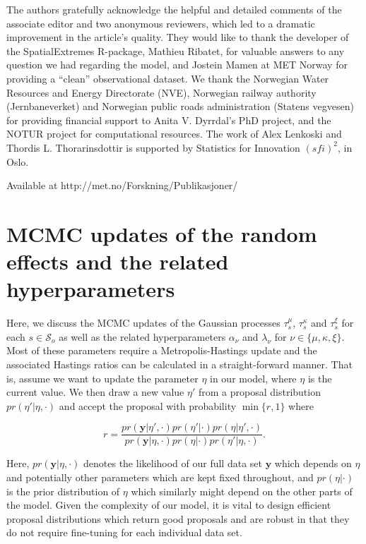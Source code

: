 \documentclass[11pt,english]{article}
\newcommand{\bs}[1]{\boldsymbol{#1}}
\newcommand{\mc}[1]{\mathcal{#1}}
\newcommand{\bl}{\begin{linenomath}}
\newcommand{\el}{\end{linenomath}}
\begin{document}
The authors gratefully acknowledge the helpful and detailed comments of the associate editor and two anonymous reviewers, which led to a dramatic improvement in the article's quality.  They would like to thank the developer of the SpatialExtremes R-package, Mathieu Ribatet, for valuable answers to any question we had regarding the model, and Jostein Mamen at MET Norway for providing a ``clean'' observational dataset. We thank the Norwegian Water Resources and Energy Directorate (NVE), Norwegian railway authority (Jernbaneverket) and Norwegian public roads administration (Statens vegvesen) for providing financial support to Anita V. Dyrrdal's PhD project, and the NOTUR project for computational resources. The work of Alex Lenkoski and Thordis L. Thorarinsdottir is supported by Statistics for Innovation $(sfi)^2$, in Oslo.




\vspace{15mm}
\noindent*Available at http://met.no/Forskning/Publikasjoner/

\appendix

\section{MCMC updates of the random effects and the related hyperparameters}

Here, we discuss the MCMC updates of the Gaussian processes $\tau_s^\mu$, $\tau_s^\kappa$ and $\tau^\xi_s$ for each $s \in \mc{S}_o$ as well as the related hyperparameters $\alpha_\nu$ and $\lambda_\nu$ for $\nu \in \{ \mu, \kappa, \xi \}$. Most of these parameters require a Metropolis-Hastings update and the associated Hastings ratios \citep[e.g.][]{Hoff2009} can be calculated in a straight-forward manner.  That is, assume we want to update the parameter $\eta$ in our model, where $\eta$ is the current value. We then draw a new value $\eta'$ from a proposal distribution $pr(\eta' | \eta, \cdot)$ and accept the proposal with probability $\min \{ r, 1 \}$ where 
\bl\[
r = \frac{pr(\bs{y}| \eta', \cdot) pr(\eta' | \cdot) pr(\eta | \eta', \cdot)}{pr(\bs{y} | \eta, \cdot) pr (\eta| \cdot) pr(\eta' | \eta, \cdot)}.
\]\el
Here, $pr(\bs{y} | \eta, \cdot)$ denotes the likelihood of our full data set $\bs{y}$ which depends on $\eta$ and potentially other parameters which are kept fixed throughout, and $pr( \eta | \cdot)$ is the prior distribution of $\eta$ which similarly might depend on the other parts of the model.  Given the complexity of our model, it is vital to design efficient proposal distributions which return good proposals and are robust in that they do not require fine-tuning for each individual data set.  
\end{document}
